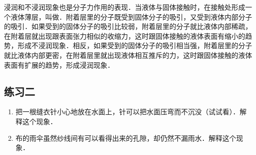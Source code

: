 浸润和不浸润现象也是分子力作用的表现．当液体与固体接触时，在接触处形成一个液体薄层，叫做．附着层里的分子既受到固体分子的吸引，又受到液体内部分子的吸引．如果受到的固体分子的吸引比较弱，附着层里的分子就比液体内部稀疏，在附着层就出现跟表面张力相似的收缩力，这时跟固体接触的液体表面有缩小的趋势，形成不浸润现象．相反，如果受到的固体分子的吸引相当强，附着层里的分子就比液体内部更密，在附着层里就出现液体相互推斥的力，这时跟固体接触的液体表面有扩展的趋势，形成浸润现象．

\subsection*{练习二}

\begin{enumerate}
   \item 把一根缝衣针小心地放在水面上，针可以把水面压弯而不沉没（试试看）．解释这个现象．
   \item 布的雨伞虽然纱线间有可以看得出来的孔隙，却仍然不漏雨水．解释这个现象．
\end{enumerate}


